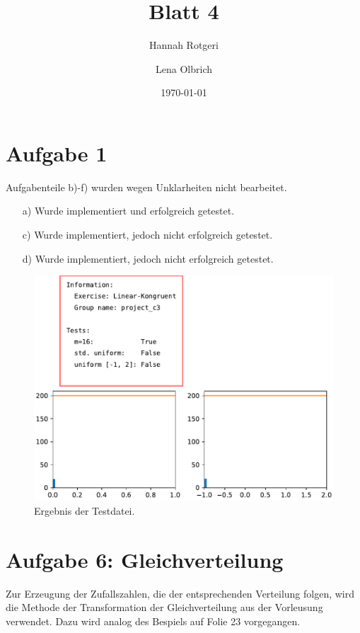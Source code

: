 \documentclass[11pt,a4paper]{article}
\title{Blatt 4}
\date{\today}
\author{Hannah Rotgeri \and Lena Olbrich}
\begin{document}
    \maketitle

    \section*{Aufgabe 1}
Aufgabenteile b)-f) wurden
wegen Unklarheiten nicht bearbeitet.
 

	\begin{itemize}
		\item[a)] Wurde implementiert und erfolgreich getestet.
		\item[c)] Wurde implementiert, jedoch nicht erfolgreich getestet.
		\item[d)] Wurde implementiert, jedoch nicht erfolgreich getestet.  
	\end{itemize}
 
	\begin{figure}[h]
		\centering
		\includegraphics[width=\textwidth]{lcg.pdf}
		\caption{Ergebnis der Testdatei.}
	\end{figure}

	\section*{Aufgabe 6: Gleichverteilung}

	Zur Erzeugung der Zufallszahlen, die der entsprechenden Verteilung folgen,
	wird die Methode der Transformation der Gleichverteilung aus der Vorleusung verwendet.
	Dazu wird analog des Bespiels auf Folie 23 vorgegangen.
\end{document}
